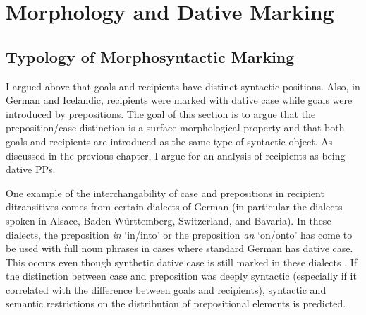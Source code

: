 \section{Morphology and Dative Marking}
	\subsection{Typology of Morphosyntactic Marking}
	I argued above that goals and recipients have distinct syntactic positions. Also, in German and Icelandic, recipients were marked with dative case while goals were introduced by prepositions. The goal of this section is to argue that the preposition/case distinction is a surface morphological property and that both goals and recipients are introduced as the same type of syntactic object. As discussed in the previous chapter, I argue for an analysis of recipients as being dative PPs.

	One example of the interchangability of case and prepositions in recipient ditransitives comes from certain dialects of German (in particular the dialects spoken in Alsace, Baden-Württemberg, Switzerland, and Bavaria). In these dialects, the preposition \textit{in} `in/into' or the preposition \textit{an} `on/onto' has come to be used with full noun phrases in cases where standard German has dative case. This occurs even though synthetic dative case is still marked in these dialects \citep{Seiler.2001,Seiler.2003}. If the distinction between case and preposition was deeply syntactic (especially if it correlated with the difference between goals and recipients), syntactic and semantic restrictions on the distribution of prepositional elements is predicted. 
	
